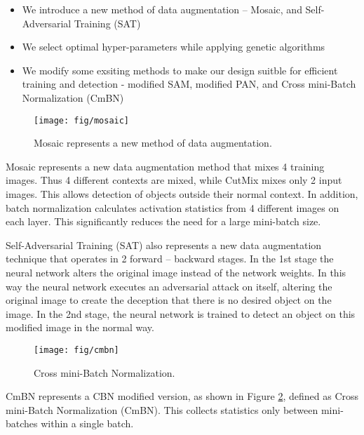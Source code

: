 \documentclass[10pt,twocolumn,letterpaper]{article}
\begin{document}
\begin{itemize}
	\item We introduce a new method of data augmentation – Mosaic, and Self-Adversarial Training (SAT)
	\item We select optimal hyper-parameters while applying genetic algorithms
	\item We modify some exsiting methods to make our design suitble for efficient training and detection - modified SAM, modified PAN, and Cross mini-Batch Normalization (CmBN)
\end{itemize}

\begin{figure}[h]
	\begin{center}
		\texttt{[image: fig/mosaic]}
	\end{center}
    \vspace{-6mm}
	\caption{Mosaic represents a new method of data augmentation.  }
	\label{fig:mosaic}
\end{figure}

Mosaic represents a new data augmentation method that mixes 4 training images. Thus 4 different contexts are mixed, while CutMix mixes only 2 input images. This allows detection of objects outside their normal context. In addition, batch normalization calculates activation statistics from 4 different images on each layer. This significantly reduces the need for a large mini-batch size.

Self-Adversarial Training (SAT) also represents a new data augmentation technique that operates in 2 forward – backward stages. In the 1st stage the neural network alters the original image instead of the network weights. In this way the neural network executes an adversarial attack on itself, altering the original image to create the deception that there is no desired object on the image. In the 2nd stage, the neural network is trained to detect an object on this modified image in the normal way.

\begin{figure}[h]
	\begin{center}
		\texttt{[image: fig/cmbn]}
	\end{center}
    \vspace{-6mm}
	\caption{Cross mini-Batch Normalization.  }
	\label{fig:cmbn}
\end{figure}

CmBN represents a CBN modified version, as shown in Figure \ref{fig:cmbn}, defined as Cross mini-Batch Normalization (CmBN). This collects statistics only between mini-batches within a single batch.
\end{document}
